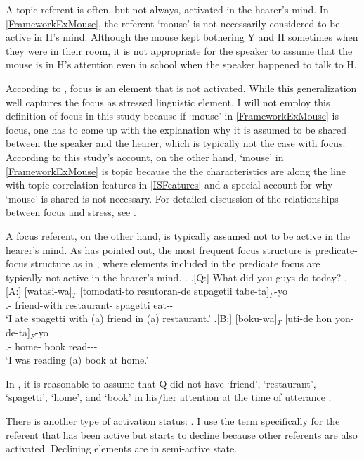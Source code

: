 A topic referent is often, but not always, activated in the hearer's mind.
In \ref{FrameworkExMouse},
the referent `mouse' is not necessarily considered to be active in H's mind.
Although the mouse kept bothering Y and H sometimes when they were in their room,
it is not appropriate for the speaker to assume that the mouse is in H's attention even in school when the speaker happened to talk to H.

According to ,
focus is an element that is not activated.
While this generalization well captures the focus as stressed linguistic element,
I will not employ this definition of focus in this study
because if  `mouse' in \ref{FrameworkExMouse} is focus,
one has to come up with the explanation why it is assumed to be shared between the speaker and the hearer,
which is typically not the case with focus.
According to this study's account, on the other hand,
 `mouse' in \ref{FrameworkExMouse} is topic because the the characteristics are along the line with topic correlation features in \ref{ISFeatures}
and a special account for why  `mouse' is shared is not necessary.
For detailed discussion of the relationships between focus and stress,
see .

A focus referent, on the other hand, is typically assumed not to be active in the hearer's mind.
As  has pointed out,
the most frequent focus structure is predicate-focus structure as in \Next[A,B],
where elements included in the predicate focus are typically not active in the hearer's mind.
\ex.\label{tomodati} \a.[Q:] What did you guys do today?
	\bg.[A:] [watasi-wa]$_{T}$ [tomodati-to resutoran-de supagetii tabe-ta]$_{F}$-yo \\
			.- friend-with restaurant- spagetti eat-- \\
			`I ate spagetti with (a) friend in (a) restaurant.'
	\bg.[B:] [boku-wa]$_{T}$ [uti-de hon yon-de-ta]$_{F}$-yo \\
			.- home- book read--- \\
			`I was reading (a) book at home.'

In \Last,
it is reasonable to assume that
Q did not have `friend', `restaurant', `spagetti', `home', and `book' in his/her attention at the time of utterance \Last[Q].

There is another type of activation status: .
I use the term  specifically for the referent that has been active but starts to decline because other referents are also activated.
Declining elements are in semi-active state.

